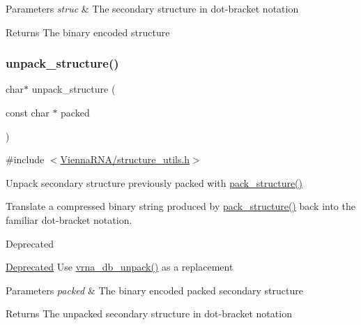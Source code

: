 \begin{DoxyParams}{Parameters}
{\em struc} & The secondary structure in dot-\/bracket notation \\
\hline
\end{DoxyParams}
\begin{DoxyReturn}{Returns}
The binary encoded structure 
\end{DoxyReturn}
\mbox{\label{group__struct__utils_ga071c6921efe1eb974f115ee6fefa3c39}} 
\subsubsection{\texorpdfstring{unpack\+\_\+structure()}{unpack\_structure()}}
{\footnotesize\ttfamily char$\ast$ unpack\+\_\+structure (\begin{DoxyParamCaption}\item[{const char $\ast$}]{packed }\end{DoxyParamCaption})}



{\ttfamily \#include $<$\hyperlink{structure__utils_8h}{Vienna\+R\+N\+A/structure\+\_\+utils.\+h}$>$}



Unpack secondary structure previously packed with \hyperlink{group__struct__utils_gac6dfa5e22928c087c6e09ff0054a7ced}{pack\+\_\+structure()} 

Translate a compressed binary string produced by \hyperlink{group__struct__utils_gac6dfa5e22928c087c6e09ff0054a7ced}{pack\+\_\+structure()} back into the familiar dot-\/bracket notation.

\begin{DoxyRefDesc}{Deprecated}
\item[\hyperlink{deprecated__deprecated000138}{Deprecated}]Use \hyperlink{group__struct__utils_ga6490adff857d84ce06e6f379ae3a4512}{vrna\+\_\+db\+\_\+unpack()} as a replacement \end{DoxyRefDesc}

\begin{DoxyParams}{Parameters}
{\em packed} & The binary encoded packed secondary structure \\
\hline
\end{DoxyParams}
\begin{DoxyReturn}{Returns}
The unpacked secondary structure in dot-\/bracket notation 
\end{DoxyReturn}
\mbox{\label{group__struct__utils_ga89c32307ee50a0026f4a3131fac0845a}} 
